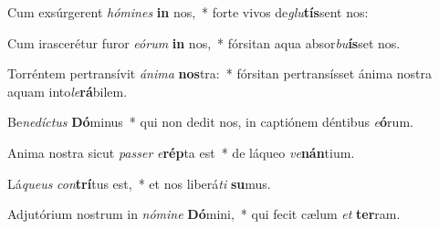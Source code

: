 \item Cum exsúrgerent \textit{hó}\textit{mi}\textit{nes} \textbf{in} nos,~* forte vivos de\textit{glu}\textbf{tís}sent nos:
\item Cum irascerétur furor \textit{e}\textit{ó}\textit{rum} \textbf{in} nos,~* fórsitan aqua absor\textit{bu}\textbf{ís}set nos.
\item Torréntem pertransívit \textit{á}\textit{ni}\textit{ma} \textbf{nos}tra:~* fórsitan pertransísset ánima nostra aquam into\textit{le}\textbf{rá}bilem.
\item Be\textit{ne}\textit{díc}\textit{tus} \textbf{Dó}minus~* qui non dedit nos, in captiónem déntibus \textit{e}\textbf{ó}rum.
\item Anima nostra sicut \textit{pas}\textit{ser} \textit{e}\textbf{rép}ta est~* de láqueo \textit{ve}\textbf{nán}tium.
\item Lá\textit{que}\textit{us} \textit{con}\textbf{trí}tus est,~* et nos liberá\textit{ti} \textbf{su}mus.
\item Adjutórium nostrum in \textit{nó}\textit{mi}\textit{ne} \textbf{Dó}mini,~* qui fecit cælum \textit{et} \textbf{ter}ram.
